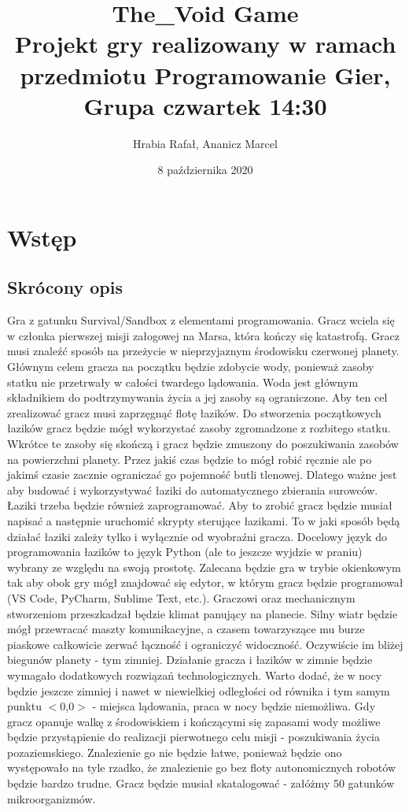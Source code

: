 \documentclass[a4paper,12pt]{article}
\author{Hrabia Rafał, Ananicz Marcel}
\title{
The\_Void Game \\
\vspace{1em}
\small Projekt gry realizowany w ramach przedmiotu Programowanie Gier,\\
Grupa czwartek 14:30
}
\date{8 października 2020}
\begin{document}
\maketitle

\pagebreak

\tableofcontents

\pagebreak

\section{Wstęp}
\subsection{Skrócony opis}

Gra z gatunku Survival/Sandbox z elementami programowania. Gracz wciela się w członka pierwszej misji załogowej na Marsa, która kończy się katastrofą. Gracz musi znaleźć sposób na przeżycie w nieprzyjaznym środowisku czerwonej planety. Głównym celem gracza na początku będzie zdobycie wody, ponieważ zasoby statku nie przetrwały w całości twardego lądowania. Woda jest głównym składnikiem do podtrzymywania życia a jej zasoby są ograniczone. Aby ten cel zrealizować gracz musi zaprzęgnąć flotę łazików. Do stworzenia początkowych łazików gracz będzie mógł wykorzystać zasoby zgromadzone z rozbitego statku. Wkrótce te zasoby się skończą i gracz będzie zmuszony do poszukiwania zasobów na powierzchni planety. Przez jakiś czas będzie to mógł robić ręcznie ale po jakimś czasie zacznie ograniczać go pojemność butli tlenowej. Dlatego ważne jest aby budować i wykorzystywać łaziki do automatycznego zbierania surowców. Łaziki trzeba będzie również zaprogramować. Aby to zrobić gracz będzie musiał napisać a następnie uruchomić skrypty sterujące łazikami. To w jaki sposób będą działać łaziki zależy tylko i wyłącznie od wyobraźni gracza. Docelowy język do programowania łazików to język Python (ale to jeszcze wyjdzie w praniu) wybrany ze względu na swoją prostotę. Zalecana będzie gra w trybie okienkowym tak aby obok gry mógł znajdować się edytor, w którym gracz będzie programował (VS Code, PyCharm, Sublime Text, etc.). Graczowi oraz mechanicznym stworzeniom przeszkadzał będzie klimat panujący na planecie. Silny wiatr będzie mógł przewracać maszty komunikacyjne, a czasem towarzyszące mu burze piaskowe całkowicie zerwać łączność i ograniczyć widoczność. Oczywiście im bliżej biegunów planety - tym zimniej. Działanie gracza i łazików w zimnie będzie wymagało dodatkowych rozwiązań technologicznych. Warto dodać, że w nocy będzie jeszcze zimniej i nawet w niewielkiej odległości od równika i tym samym punktu $<$0,0$>$ - miejsca lądowania, praca w nocy będzie niemożliwa. Gdy gracz opanuje walkę z środowiskiem i kończącymi się zapasami wody możliwe będzie przystąpienie do realizacji pierwotnego celu misji - poszukiwania życia pozaziemskiego. Znalezienie go nie będzie łatwe, ponieważ będzie ono występowało na tyle rzadko, że znalezienie go bez floty autonomicznych robotów będzie bardzo trudne. Gracz będzie musiał skatalogować - załóżmy 50 gatunków mikroorganizmów.
\end{document}
